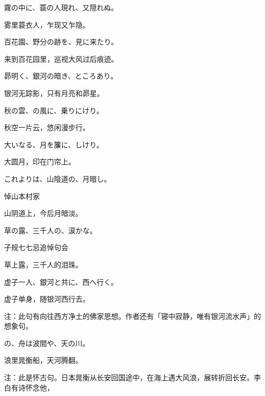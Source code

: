 \begin{haiku}
    {\FH 霧の中に、蓑の人現れ、又隠れぬ。}

    {\FK 雾里蓑衣人，乍现又乍隐。}
\end{haiku}

\begin{haiku}
    {\FH 百花園、野分の跡を、見に来たり。}

    {\FK 来到百花园里，巡视大风过后痕迹。}
\end{haiku}

\begin{haiku}
    {\FH 昴明く、銀河の暗き、ところあり。}

    {\FK 银河无踪影，只有月亮和昴星。}
\end{haiku}

\begin{haiku}
    {\FH 秋の雲、の風に、乗りにけり。}

    {\FK 秋空一片云，悠闲漫步行。}
\end{haiku}

\begin{haiku}
    {\FH 大いなる、月を簾に、しけり。}

    {\FK 大圆月，印在门帘上。}
\end{haiku}

\begin{haiku}
    {\FH これよりは、山陰道の、月暗し。}

    {\FK 悼山本村家}

    {\FK 山阴道上，今后月暗淡。}
\end{haiku}

\begin{haiku}
    {\FH 草の露、三千人の、涙かな。}

    {\FK 子规七七忌追悼句会}

    {\FK 草上露，三千人的泪珠。}
\end{haiku}

\begin{haiku}
    {\FH 虚子一人、銀河と共に、西へ行く。}

    {\FK 虚子单身，随银河西行去。}

    {\FT 注：此句有向往西方净土的佛家思想。作者还有「寝中寂静，唯有银河流水声」的想象句。}
\end{haiku}

\begin{haiku}
    {\FH {}の、舟は波間や、天の川。}

    {\FK 浪里晁衡船，天河腾翻。}

    {\FT 注：此是怀古句。日本晁衡从长安回国途中，在海上遇大风浪，展转折回长安。李白有诗怀念他，}
\end{haiku}

